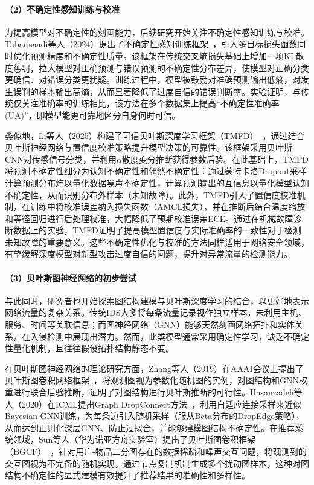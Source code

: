 \paragraph{（2）不确定性感知训练与校准}

为提高模型对不确定性的刻画能力，后续研究开始关注不确定性感知训练与校准。Tabarisaadi等人（2024）提出了不确定性感知训练框架~\cite{Tabarisaadi2024}，引入多目标损失函数同时优化预测精度和不确定性质量。该框架在传统交叉熵损失基础上增加一项KL散度惩罚，拉大模型对正确预测与错误预测的不确定性分布差异，使模型对正确分类更确信、对错误分类更犹疑。训练过程中，模型被鼓励对准确预测输出低熵，对发生误判的样本输出高熵，从而显著降低了过度自信的错误判断率。实验证明，与传统仅关注准确率的训练相比，该方法在多个数据集上提高``不确定性准确率(UA)''，即模型能更可靠地区分自身何时可信。

类似地，Li等人（2025）构建了可信贝叶斯深度学习框架（TMFD）~\cite{Li2025TrustworthyBayesian}，通过结合贝叶斯神经网络与置信度校准策略提升模型决策的可靠性。该框架采用贝叶斯CNN对传感信号分类，并利用$\alpha$散度变分推断获得参数后验。在此基础上，TMFD将预测不确定性细分为认知不确定性和偶然不确定性：通过蒙特卡洛Dropout采样计算预测分布熵以量化数据噪声不确定性，计算预测输出的互信息以量化模型认知不确定性，从而识别分布外样本（未知故障）。此外，TMFD引入了置信度校准机制，在训练中将校准误差纳入损失函数（AMCL损失），并在推断后结合温度缩放和等径回归进行后处理校准，大幅降低了预期校准误差ECE。通过在机械故障诊断数据上的实验，TMFD证明了提高模型置信度与实际准确率的一致性对于检测未知故障的重要意义。这些不确定性优化与校准的方法同样适用于网络安全领域，有望缓解深度模型对新型攻击过度自信的问题，提升对异常流量的检测能力。

\paragraph{（3）贝叶斯图神经网络的初步尝试}

与此同时，研究者也开始探索图结构建模与贝叶斯深度学习的结合，以更好地表示网络流量的复杂关系。传统IDS大多将每条流量记录视作独立样本，未利用主机、服务、时间等关联信息；而图神经网络（GNN）能够天然刻画网络拓扑和实体关系，在入侵检测中展现出潜力。然而，此类模型通常采用确定性学习，缺乏不确定性量化机制，且往往假设拓扑结构静态不变。

在贝叶斯图神经网络的理论研究方面，Zhang等人（2019）在AAAI会议上提出了贝叶斯图卷积网络框架~\cite{Zhang2019BGCN}，将观测图视为参数化随机图的实例，对图结构和GNN权重进行联合后验推断，证明了对图结构进行贝叶斯推断的可行性。Hasanzadeh等人（2020）在ICML提出Graph DropConnect方法~\cite{Hasanzadeh2020GDC}，利用自适应连接采样来近似Bayesian GNN训练，为每条边引入随机采样（服从Beta分布的DropEdge策略），从而达到正则化深层GNN、防止过拟合，并能够建模图结构不确定性。在推荐系统领域，Sun等人（华为诺亚方舟实验室）提出了贝叶斯图卷积框架（BGCF）~\cite{Sun2020}，针对用户-物品二分图存在的数据稀疏和噪声交互问题，将观测到的交互图视为不完备的随机实现，通过节点复制机制生成多个扰动图样本，这种对图结构不确定性的显式建模有效提升了推荐结果的准确性和多样性。

